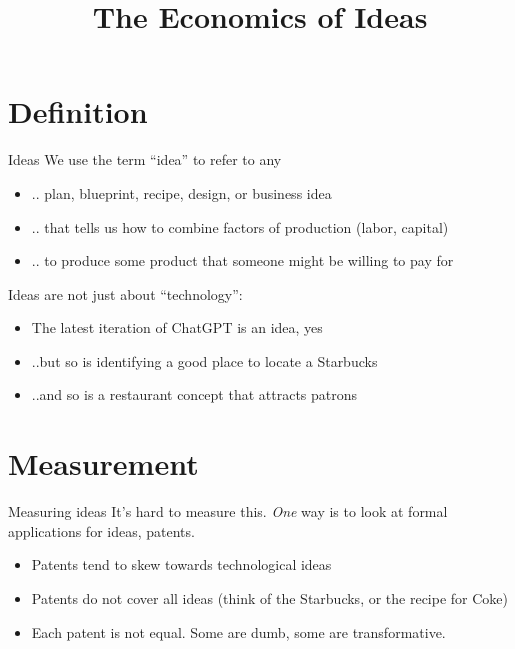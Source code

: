 

\title[Ideas]{The Economics of Ideas}



\maketitle

\section{Definition}
\begin{frame}{Ideas}
We use the term ``idea'' to refer to any
\begin{itemize}
	\item .. plan, blueprint, recipe, design, or business idea
	\item .. that tells us how to combine factors of production (labor, capital)
	\item .. to produce some product that someone might be willing to pay for
\end{itemize}
Ideas are not just about ``technology'':
\begin{itemize}
	\item The latest iteration of ChatGPT is an idea, yes
	\item ..but so is identifying a good place to locate a Starbucks
	\item ..and so is a restaurant concept that attracts patrons
\end{itemize} 
\end{frame}

\section{Measurement}
\begin{frame}{Measuring ideas}
It's hard to measure this. \textit{One} way is to look at formal applications for ideas, patents.
\begin{itemize}
	\item Patents tend to skew towards technological ideas
	\item Patents do not cover all ideas (think of the Starbucks, or the recipe for Coke)
	\item Each patent is not equal. Some are dumb, some are transformative.
\end{itemize}
\end{frame}

